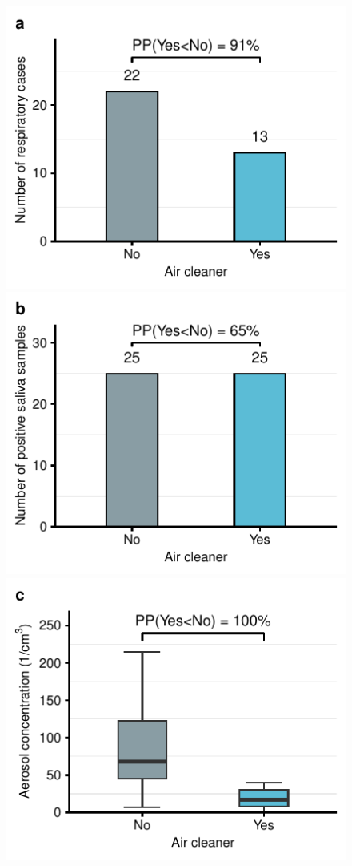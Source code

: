 \documentclass[fleqn,11pt]{wlscirep}
\begin{document}
\begin{figure}[!htpb]
\centering
    \includegraphics{../../results/epi-data/cases_by_condition.pdf}\hspace{.5cm}
    \includegraphics{../../results/mol-data/saliva-by-study-condition.pdf}
    \includegraphics{../../results/env-data/aerosol-number-boxplot.pdf}\hspace{.5cm}

\end{figure}
\end{document}
